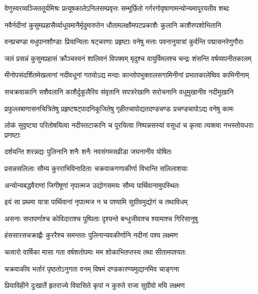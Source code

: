 \twolineshloka
{वेणुस्वरव्यञ्जिततूर्यमिश्रः प्रत्यूषकालेऽनिलसम्प्रवृत्तः}
{सम्मूर्छितो गर्गरगोवृषाणामन्योन्यमापूरयतीव शब्दः} %

\twolineshloka
{नवैर्नदीनां कुसुमप्रहासैर्व्याधूयमानैर्मृदुमारुतेन}
{धौतामलक्षौमपटप्रकाशैः कूलानि काशैरुपशोभितानि} %

\twolineshloka
{वनप्रचण्डा मधुपानशौण्डाः प्रियान्विताः षट्चरणाः प्रहृष्टाः}
{वनेषु मत्ताः पवनानुयात्रां कुर्वन्ति पद्मासनरेणुगौराः} %

\twolineshloka
{जलं प्रसन्नं कुसुमप्रहासं क्रौञ्चस्वनं शालिवनं विपक्वम्}
{मृदुश्च वायुर्विमलश्च चन्द्रः शंसन्ति वर्षव्यपनीतकालम्} %

\twolineshloka
{मीनोपसंदर्शितमेखलानां नदीवधूनां गतयोऽद्य मन्दाः}
{कान्तोपभुक्तालसगामिनीनां प्रभातकालेष्विव कामिनीनाम्} %

\twolineshloka
{सचक्रवाकानि सशैवलानि काशैर्दुकूलैरिव संवृतानि}
{सपत्ररेखाणि सरोचनानि वधूमुखानीव नदीमुखानि} %

\twolineshloka
{प्रफुल्लबाणासनचित्रितेषु प्रहृष्टषट्पादनिकूजितेषु}
{गृहीतचापोद्यतदण्डचण्डः प्रचण्डचापोऽद्य वनेषु कामः} %

\twolineshloka
{लोकं सुवृष्ट्या परितोषयित्वा नदीस्तटाकानि च पूरयित्वा}
{निष्पन्नसस्यां वसुधां च कृत्वा त्यक्त्वा नभस्तोयधराः प्रणष्टाः} %

\twolineshloka
{दर्शयन्ति शरन्नद्यः पुलिनानि शनैः शनैः}
{नवसंगमसव्रीडा जघनानीव योषितः} %

\twolineshloka
{प्रसन्नसलिलाः सौम्य कुरराभिविनादिताः}
{चक्रवाकगणाकीर्णा विभान्ति सलिलाशयाः} %

\twolineshloka
{अन्योन्यबद्धवैराणां जिगीषूणां नृपात्मज}
{उद्योगसमयः सौम्य पार्थिवानामुपस्थितः} %

\twolineshloka
{इयं सा प्रथमा यात्रा पार्थिवानां नृपात्मज}
{न च पश्यामि सुग्रीवमुद्योगं च तथाविधम्} %

\twolineshloka
{असनाः सप्तपर्णाश्च कोविदाराश्च पुष्पिताः}
{दृश्यन्ते बन्धुजीवाश्च श्यामाश्च गिरिसानुषु} %

\twolineshloka
{हंससारसचक्राह्वैः कुररैश्च समन्ततः}
{पुलिनान्यवकीर्णानि नदीनां पश्य लक्ष्मण} %

\twolineshloka
{चत्वारो वार्षिका मासा गता वर्षशतोपमाः}
{मम शोकाभितप्तस्य तथा सीतामपश्यतः} %

\twolineshloka
{चक्रवाकीव भर्तारं पृष्ठतोऽनुगता वनम्}
{विषमं दण्डकारण्यमुद्यानमिव चाङ्गना} %

\twolineshloka
{प्रियाविहीने दुःखार्ते हृतराज्ये विवासिते}
{कृपां न कुरुते राजा सुग्रीवो मयि लक्ष्मण} %

